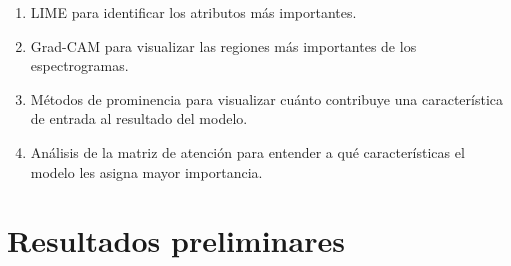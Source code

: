 \documentclass[conference]{IEEEtran}
\begin{document}
\begin{enumerate}
    \item LIME \cite{ribeiro2016why} para identificar los atributos más importantes.
    \item Grad-CAM \cite{DBLP:journals/corr/SelvarajuDVCPB16} para visualizar las regiones más importantes de los espectrogramas.
    \item Métodos de prominencia para visualizar cuánto contribuye una característica de entrada al resultado del modelo.
    \item Análisis de la matriz de atención para entender a qué características el modelo les asigna mayor importancia.
\end{enumerate}

\section{Resultados preliminares}

\printbibliography
\end{document}
